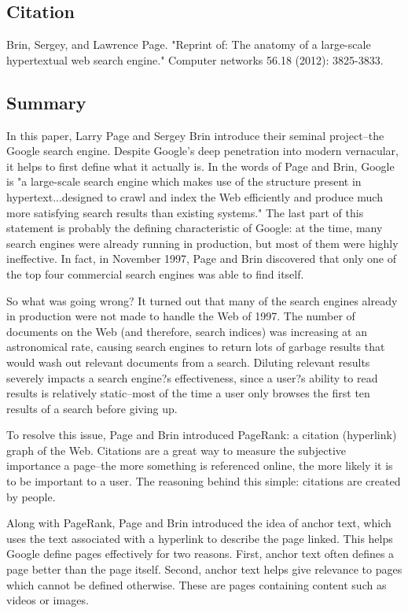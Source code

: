 \documentclass[../summaries.tex]{subfiles}
\begin{document}
\subsection{Citation}
Brin, Sergey, and Lawrence Page. "Reprint of: The anatomy of a large-scale hypertextual web search engine." Computer networks 56.18 (2012): 3825-3833.

\subsection{Summary}
In this paper, Larry Page and Sergey Brin introduce their seminal project--the Google search engine. Despite Google's deep penetration into modern vernacular, it helps to first define what it actually is. In the words of Page and Brin, Google is "a large-scale search engine which makes use of the structure present in hypertext...designed to crawl and index the Web efficiently and produce much more satisfying search results than existing systems."  The last part of this statement is probably the defining characteristic of Google:  at the time, many search engines were already running in production, but most of them were highly ineffective. In fact, in November 1997, Page and Brin discovered that only one of the top four commercial search engines was able to find itself.

So what was going wrong? It turned out that many of the search engines already in production were not made to handle the Web of 1997. The number of documents on the Web (and therefore, search indices) was increasing at an astronomical rate, causing search engines to return lots of garbage results that would wash out relevant documents from a search. Diluting relevant results severely impacts a search engine?s effectiveness, since a user?s ability to read results is relatively static--most of the time a user only browses the first ten results of a search before giving up.

To resolve this issue, Page and Brin introduced PageRank: a citation (hyperlink) graph of the Web. Citations are a great way to measure the subjective importance a page--the more something is referenced online, the more likely it is to be important to a user. The reasoning behind this simple: citations are created by people.

Along with PageRank, Page and Brin introduced the idea of anchor text, which uses the text associated with a hyperlink to describe the page linked. This helps Google define pages effectively for two reasons. First, anchor text often defines a page better than the page itself. Second, anchor text helps give relevance to pages which cannot be defined otherwise. These are pages containing content such as videos or images.
	
\end{document}
